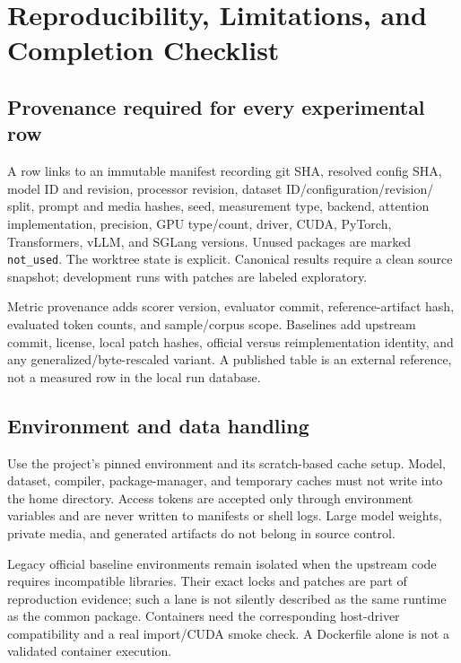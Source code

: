 \section{Reproducibility, Limitations, and Completion Checklist}
\label{app:artifact}
\subsection{Provenance required for every experimental row}
A row links to an immutable manifest recording git SHA, resolved config SHA,
model ID and revision, processor revision, dataset ID/configuration/revision/
split, prompt and media hashes, seed, measurement type, backend, attention
implementation, precision, GPU type/count, driver, CUDA, PyTorch, Transformers,
vLLM, and SGLang versions. Unused packages are marked \texttt{not\_used}.
The worktree state is explicit. Canonical results require a clean source
snapshot; development runs with patches are labeled exploratory.

Metric provenance adds scorer version, evaluator commit, reference-artifact
hash, evaluated token counts, and sample/corpus scope. Baselines add upstream
commit, license, local patch hashes, official versus reimplementation identity,
and any generalized/byte-rescaled variant. A published table is an external
reference, not a measured row in the local run database.

\subsection{Environment and data handling}
Use the project's pinned environment and its scratch-based cache setup. Model,
dataset, compiler, package-manager, and temporary caches must not write into
the home directory. Access tokens are accepted only through environment
variables and are never written to manifests or shell logs. Large model weights,
private media, and generated artifacts do not belong in source control.

Legacy official baseline environments remain isolated when the upstream code
requires incompatible libraries. Their exact locks and patches are part of
reproduction evidence; such a lane is not silently described as the same
runtime as the common package. Containers need the corresponding host-driver
compatibility and a real import/CUDA smoke check. A Dockerfile alone is not a
validated container execution.

